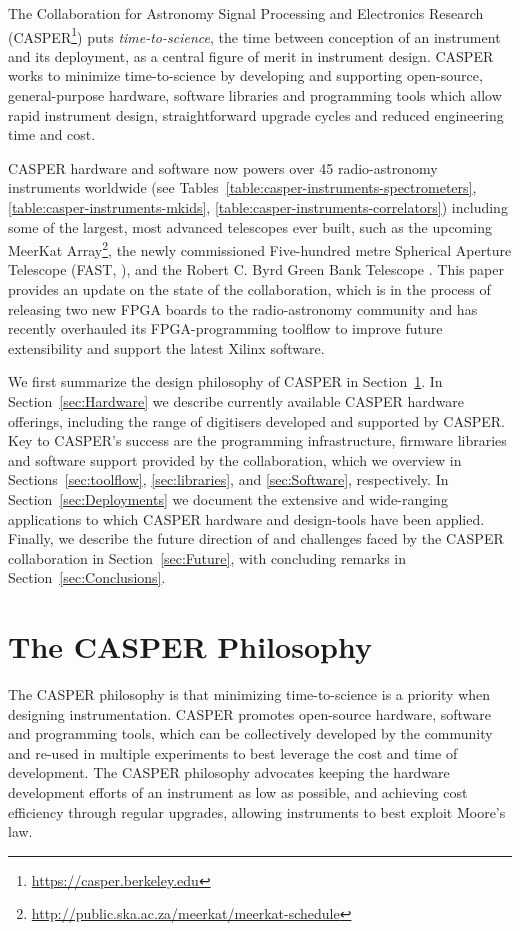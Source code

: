 \documentclass{ws-jai}
\begin{document}
The Collaboration for Astronomy Signal Processing and Electronics Research
(CASPER\footnote{\url{https://casper.berkeley.edu}}) puts
\emph{time-to-science}, the time between conception of an instrument and its
deployment, as a central figure of merit in instrument design. CASPER works to
minimize time-to-science by developing and supporting open-source,
general-purpose hardware, software libraries and programming tools which allow
rapid instrument design, straightforward upgrade cycles and reduced engineering time and cost.

CASPER hardware and software now powers over 45 radio-astronomy
instruments worldwide (see Tables~\ref{table:casper-instruments-spectrometers},
\ref{table:casper-instruments-mkids},
\ref{table:casper-instruments-correlators}) including some of the largest, most
advanced telescopes ever built, such as the upcoming MeerKat
Array\footnote{\url{http://public.ska.ac.za/meerkat/meerkat-schedule}}, the
newly commissioned Five-hundred metre Spherical Aperture Telescope (FAST,
\citet{fast}), and the Robert C. Byrd Green Bank Telescope \citep{vegas}. This paper
provides an update on the state of the collaboration, which is in the process of releasing
two new FPGA boards to the radio-astronomy community and has recently overhauled
its FPGA-programming toolflow to improve future extensibility and support the latest Xilinx software.

We first summarize the design philosophy of CASPER in
Section~\ref{sec:CASPER-philosophy}.  In Section~\ref{sec:Hardware} we describe
currently available CASPER hardware offerings, including the range of
digitisers developed and supported by CASPER. Key to CASPER's success are the
programming infrastructure, firmware libraries and software support provided by the
collaboration, which we overview in Sections~\ref{sec:toolflow}, \ref{sec:libraries}, and \ref{sec:Software}, respectively.  In
Section~\ref{sec:Deployments} we document the extensive and wide-ranging
applications to which CASPER hardware and design-tools have been applied.
Finally, we describe the future direction of and challenges faced by the CASPER
collaboration in Section~\ref{sec:Future}, with concluding remarks in
Section~\ref{sec:Conclusions}.

\section{The CASPER Philosophy} \label{sec:CASPER-philosophy}

The CASPER philosophy is that minimizing time-to-science is a priority when designing instrumentation. CASPER promotes open-source hardware, software and programming tools, which can be collectively developed by the community and re-used in multiple experiments to best leverage the cost and time of development.
The CASPER philosophy advocates keeping the hardware development efforts of an instrument as low as possible, and achieving cost efficiency through regular upgrades, allowing instruments to best exploit Moore's law.
\end{document}
